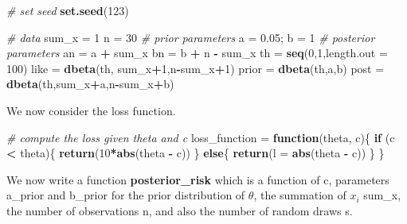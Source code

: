 \documentclass[
]{article}
\newenvironment{Shaded}{\begin{snugshade}}{\end{snugshade}}
\newcommand{\CommentTok}[1]{\textcolor[rgb]{0.56,0.35,0.01}{\textit{#1}}}
\newcommand{\ControlFlowTok}[1]{\textcolor[rgb]{0.13,0.29,0.53}{\textbf{#1}}}
\newcommand{\DataTypeTok}[1]{\textcolor[rgb]{0.13,0.29,0.53}{#1}}
\newcommand{\DecValTok}[1]{\textcolor[rgb]{0.00,0.00,0.81}{#1}}
\newcommand{\FloatTok}[1]{\textcolor[rgb]{0.00,0.00,0.81}{#1}}
\newcommand{\KeywordTok}[1]{\textcolor[rgb]{0.13,0.29,0.53}{\textbf{#1}}}
\newcommand{\NormalTok}[1]{#1}
\newcommand{\OperatorTok}[1]{\textcolor[rgb]{0.81,0.36,0.00}{\textbf{#1}}}
\newcommand{\StringTok}[1]{\textcolor[rgb]{0.31,0.60,0.02}{#1}}
\begin{document}
\begin{Shaded}
\begin{Highlighting}[]
\CommentTok{# set seed }
\KeywordTok{set.seed}\NormalTok{(}\DecValTok{123}\NormalTok{)}

\CommentTok{# data}
\NormalTok{sum_x =}\StringTok{ }\DecValTok{1}
\NormalTok{n =}\StringTok{ }\DecValTok{30}
\CommentTok{# prior parameters}
\NormalTok{a =}\StringTok{ }\FloatTok{0.05}\NormalTok{; b =}\StringTok{ }\DecValTok{1}
\CommentTok{# posterior parameters}
\NormalTok{an =}\StringTok{ }\NormalTok{a }\OperatorTok{+}\StringTok{ }\NormalTok{sum_x}
\NormalTok{bn =}\StringTok{ }\NormalTok{b }\OperatorTok{+}\StringTok{ }\NormalTok{n }\OperatorTok{-}\StringTok{ }\NormalTok{sum_x}
\NormalTok{th =}\StringTok{ }\KeywordTok{seq}\NormalTok{(}\DecValTok{0}\NormalTok{,}\DecValTok{1}\NormalTok{,}\DataTypeTok{length.out =} \DecValTok{100}\NormalTok{)}
\NormalTok{like =}\StringTok{ }\KeywordTok{dbeta}\NormalTok{(th, sum_x}\OperatorTok{+}\DecValTok{1}\NormalTok{,n}\OperatorTok{-}\NormalTok{sum_x}\OperatorTok{+}\DecValTok{1}\NormalTok{)}
\NormalTok{prior =}\StringTok{ }\KeywordTok{dbeta}\NormalTok{(th,a,b)}
\NormalTok{post =}\StringTok{ }\KeywordTok{dbeta}\NormalTok{(th,sum_x}\OperatorTok{+}\NormalTok{a,n}\OperatorTok{-}\NormalTok{sum_x}\OperatorTok{+}\NormalTok{b)}
\end{Highlighting}
\end{Shaded}

We now consider the loss function.

\begin{Shaded}
\begin{Highlighting}[]
\CommentTok{# compute the loss given theta and c }
\NormalTok{loss_function =}\StringTok{ }\ControlFlowTok{function}\NormalTok{(theta, c)\{}
  \ControlFlowTok{if}\NormalTok{ (c }\OperatorTok{<}\StringTok{ }\NormalTok{theta)\{}
    \KeywordTok{return}\NormalTok{(}\DecValTok{10}\OperatorTok{*}\KeywordTok{abs}\NormalTok{(theta }\OperatorTok{-}\StringTok{ }\NormalTok{c))}
\NormalTok{  \} }\ControlFlowTok{else}\NormalTok{\{}
    \KeywordTok{return}\NormalTok{(}\DataTypeTok{l =} \KeywordTok{abs}\NormalTok{(theta }\OperatorTok{-}\StringTok{ }\NormalTok{c))}
\NormalTok{  \}}
\NormalTok{\}}
\end{Highlighting}
\end{Shaded}

We now write a function \textbf{posterior\_risk} which is a function of
c, parameters a\_prior and b\_prior for the prior distribution of
\(\theta\), the summation of \(x_i\) sum\_x, the number of observations
n, and also the number of random draws s.
\end{document}

